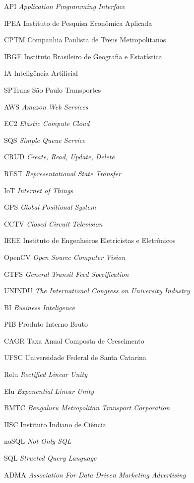 \begin{siglas}
    \item[API] \textit{Application Programming Interface}
	\item[IPEA] {Instituto de Pesquisa Econômica Aplicada}
	\item[CPTM] {Companhia Paulista de Trens Metropolitanos}
	\item[IBGE] {Instituto Brasileiro de Geografia e Estatística}
	\item[IA]  {Inteligência Artificial}
	\item[SPTrans] {São Paulo Transportes}
	\item[AWS] \textit{Amazon Web Services}
	\item[EC2] \textit{Elastic Compute Cloud}
	\item[SQS] \textit{Simple Queue Service}
	\item[CRUD] \textit{Create, Read, Update, Delete}
	\item[REST] \textit{Representational State Transfer}
	\item[IoT] \textit{Internet of Things}
	\item[GPS] \textit{Global Positional System}
	\item[CCTV] \textit{Closed Circuit Television}
	\item[IEEE] {Instituto de Engenheiros Eletricistas e Eletrônicos}
	\item[OpenCV] \textit{Open Source Computer Vision}
	\item[GTFS] \textit{General Transit Feed Specification}
	\item[UNINDU] \textit{The International Congress on University Industry}
	\item[BI] \textit{Business Inteligence}
	\item[PIB] {Produto Interno Bruto}
	\item[CAGR] {Taxa Anual Composta de Crescimento}
	\item[UFSC] {Universidade Federal de Santa Catarina}
	\item[Relu] \textit{Rectified Linear Unity}
	\item[Elu] \textit{Exponential Linear Unity}
	\item[BMTC] \textit{Bengaluru Metropolitan Transport Corporation}
	\item[IISC] {Instituto Indiano de Ciência}
	\item[noSQL] \textit{Not Only SQL}
	\item[SQL] \textit{Structed Query Language}
	\item[ADMA] \textit{Association For Data Driven Marketing Advertising}

\end{siglas}
